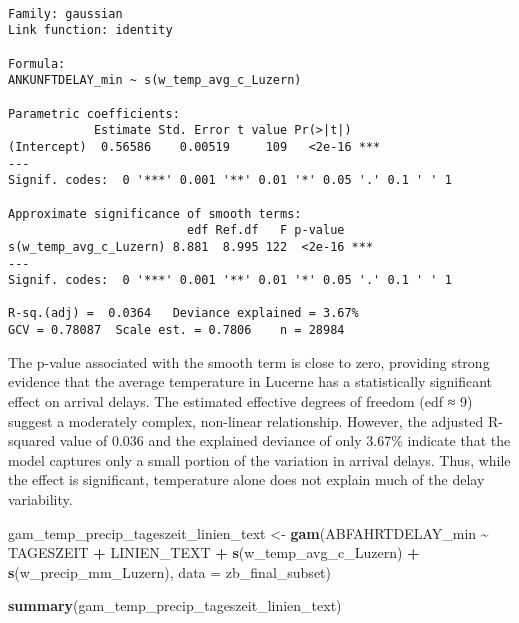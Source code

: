 \documentclass[
]{article}
\newenvironment{Shaded}{\begin{snugshade}}{\end{snugshade}}
\newcommand{\AttributeTok}[1]{\textcolor[rgb]{0.13,0.29,0.53}{#1}}
\newcommand{\FunctionTok}[1]{\textcolor[rgb]{0.13,0.29,0.53}{\textbf{#1}}}
\newcommand{\NormalTok}[1]{#1}
\newcommand{\OtherTok}[1]{\textcolor[rgb]{0.56,0.35,0.01}{#1}}
\newcommand{\SpecialCharTok}[1]{\textcolor[rgb]{0.81,0.36,0.00}{\textbf{#1}}}
\begin{document}
\begin{verbatim}

Family: gaussian 
Link function: identity 

Formula:
ANKUNFTDELAY_min ~ s(w_temp_avg_c_Luzern)

Parametric coefficients:
            Estimate Std. Error t value Pr(>|t|)    
(Intercept)  0.56586    0.00519     109   <2e-16 ***
---
Signif. codes:  0 '***' 0.001 '**' 0.01 '*' 0.05 '.' 0.1 ' ' 1

Approximate significance of smooth terms:
                         edf Ref.df   F p-value    
s(w_temp_avg_c_Luzern) 8.881  8.995 122  <2e-16 ***
---
Signif. codes:  0 '***' 0.001 '**' 0.01 '*' 0.05 '.' 0.1 ' ' 1

R-sq.(adj) =  0.0364   Deviance explained = 3.67%
GCV = 0.78087  Scale est. = 0.7806    n = 28984
\end{verbatim}

The p-value associated with the smooth term is close to zero, providing
strong evidence that the average temperature in Lucerne has a
statistically significant effect on arrival delays. The estimated
effective degrees of freedom (edf ≈ 9) suggest a moderately complex,
non-linear relationship. However, the adjusted R-squared value of 0.036
and the explained deviance of only 3.67\% indicate that the model
captures only a small portion of the variation in arrival delays. Thus,
while the effect is significant, temperature alone does not explain much
of the delay variability.

\begin{Shaded}
\begin{Highlighting}[]
\NormalTok{gam\_temp\_precip\_tageszeit\_linien\_text }\OtherTok{\textless{}{-}} \FunctionTok{gam}\NormalTok{(ABFAHRTDELAY\_min }\SpecialCharTok{\textasciitilde{}}\NormalTok{ TAGESZEIT }\SpecialCharTok{+}\NormalTok{ LINIEN\_TEXT }\SpecialCharTok{+} \FunctionTok{s}\NormalTok{(w\_temp\_avg\_c\_Luzern) }\SpecialCharTok{+} \FunctionTok{s}\NormalTok{(w\_precip\_mm\_Luzern), }\AttributeTok{data =}\NormalTok{ zb\_final\_subset) }

\FunctionTok{summary}\NormalTok{(gam\_temp\_precip\_tageszeit\_linien\_text)}
\end{Highlighting}
\end{Shaded}
\end{document}
